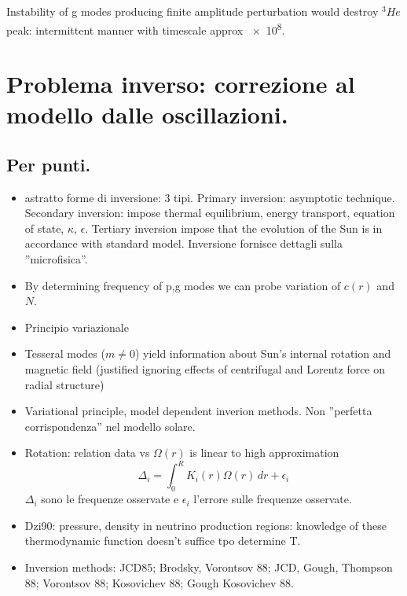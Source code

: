 \documentclass[oneside,12pt,fleqn]{memoir}
\begin{document}
Instability of g modes producing finite amplitude perturbation would destroy $^3He$ peak: intermittent manner with timescale approx \SI{e8}{\year}.


\chapter{Problema inverso: correzione al modello dalle oscillazioni.}
\PartialToc

\section{Per punti.}

\begin{itemize}
    
    \item astratto forme di inversione: 3 tipi. Primary inversion: asymptotic technique. Secondary inversion: impose thermal equilibrium, energy transport, equation of state, $\kappa$, $\epsilon$. Tertiary inversion impose that the evolution of the Sun is in accordance with standard model. Inversione fornisce dettagli sulla ''microfisica''.
    
    \item By determining frequency of p,g modes we can probe variation of $c(r)$ and $N$.
    \item Principio variazionale
    \item Tesseral modes ($m\neq0$) yield information about Sun's internal rotation and magnetic field (justified ignoring effects of centrifugal and Lorentz force on radial structure)
    \item Variational principle, model dependent inverion methods. Non ''perfetta corrispondenza'' nel modello solare.
    
    \item Rotation: relation data vs $\Omega(r)$ is linear to high approximation
    \begin{equation*}
    \Delta_i=\int_0^RK_i(r)\Omega(r)\,dr+\epsilon_i
    \end{equation*}
    $\Delta_i$ sono le frequenze osservate e $\epsilon_i$ l'errore sulle frequenze osservate.
    
    \item Dzi90: pressure, density in neutrino production regions: knowledge of these thermodynamic function doesn't suffice tpo determine T.
    
    \item Inversion methods: JCD85; Brodsky, Vorontsov 88; JCD, Gough, Thompson 88;  Vorontsov 88; Kosovichev 88; Gough Kosovichev 88.
    

\end{itemize}
\end{document}
